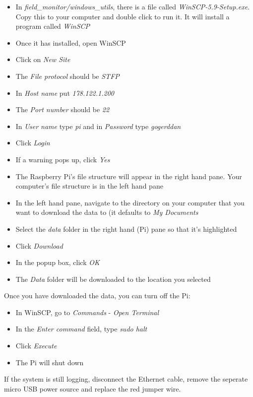 \documentclass[10pt]{article}
\begin{document}
\begin{itemize}
 \item In \textit{field\_monitor/windows\_utils}, there is a file called \textit{WinSCP-5.9-Setup.exe}. Copy this to your computer and double click to run it. It will install a program called \textit{WinSCP}
 \item Once it has installed, open WinSCP
 \item Click on \textit{New Site}
 \item The \textit{File protocol} should be \textit{STFP}
 \item In \textit{Host name} put \textit{178.122.1.200}
 \item The \textit{Port number} should be \textit{22}
 \item In \textit{User name} type \textit{pi} and in \textit{Password} type \textit{gogerddan}
 \item Click \textit{Login}
 \item If a warning pops up, click \textit{Yes}
 \item The Raspberry Pi's file structure will appear in the right hand pane. Your computer's file structure is in the left hand pane
 \item In the left hand pane, navigate to the directory on your computer that you want to download the data to (it defaults to \textit{My Documents}
 \item Select the \textit{data} folder in the right hand (Pi) pane so that it's highlighted
 \item Click \textit{Download} 
 \item In the popup box, click \textit{OK}
 \item The \textit{Data} folder will be downloaded to the location you selected
\end{itemize}

Once you have downloaded the data, you can turn off the Pi:

\begin{itemize}
 \item In WinSCP, go to \textit{Commands} - \textit{Open Terminal}
 \item In the \textit{Enter command} field, type \textit{sudo halt}
 \item Click \textit{Execute}
 \item The Pi will shut down
\end{itemize}

If the system is still logging, disconnect the Ethernet cable, remove the seperate micro USB power source and replace the red jumper wire.
\end{document}

